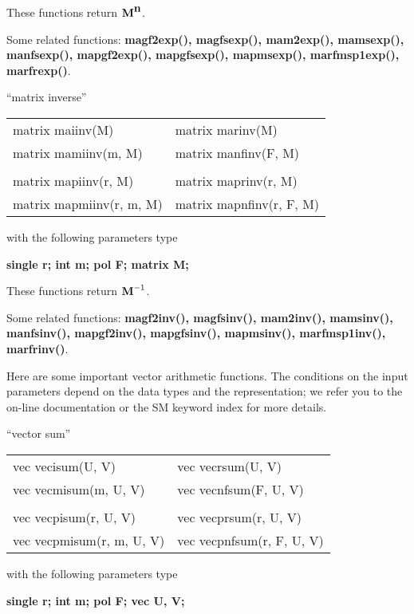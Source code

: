 These functions return $\mbox{\bf M}^{\mbox{\bf n}}$.

Some related functions:\hspace*{0.7em}
{\bf  magf2exp(), magfsexp(), mam2exp(), mamsexp(), \\
manfsexp(), mapgf2exp(), mapgfsexp(), mapmsexp(), marfmsp1exp(), \\
marfrexp()}.


\leer
\begin{center} ``matrix inverse'' \end{center}
\begin{center}
{\bf
\begin{tabular}{ll}
matrix maiinv(M)   & matrix marinv(M)   \\
matrix mamiinv(m, M)&  matrix manfinv(F, M) \\
&\\
matrix mapiinv(r, M)   & matrix maprinv(r, M) \\
matrix mapmiinv(r, m, M) & matrix mapnfinv(r, F, M) \\
\end{tabular} }
\end{center}
\parbox[t]{2.5in}{with the following parameters type}
\parbox[t]{3.0in}{
\bf single r;\newline
    int m;\newline
    pol F;\newline
    matrix M;}

These functions return $\mbox{\bf M}^{-1}$.

Some related functions:\hspace*{0.7em}
{\bf  magf2inv(), magfsinv(), mam2inv(), mamsinv(), \\
manfsinv(), mapgf2inv(), mapgfsinv(), mapmsinv(), marfmsp1inv(), marfrinv()}.


\newpage

\leer
Here are some important vector arithmetic functions. The conditions on the 
input parameters depend on the data types and the representation; we refer
you to the on-line documentation or the SM keyword index for more details.

\leer
\begin{center} ``vector sum'' \end{center}
\begin{center}
{\bf
\begin{tabular}{ll}
vec vecisum(U, V)   & vec vecrsum(U, V)   \\
vec vecmisum(m, U, V)&  vec vecnfsum(F, U, V) \\
&\\
vec vecpisum(r, U, V)   & vec vecprsum(r, U, V) \\
vec vecpmisum(r, m, U, V) & vec vecpnfsum(r, F, U, V) \\
\end{tabular} }
\end{center}
\parbox[t]{2.5in}{with the following parameters type}
\parbox[t]{3.0in}{
\bf single r;\newline
    int m;\newline
    pol F;\newline
    vec U, V;}


